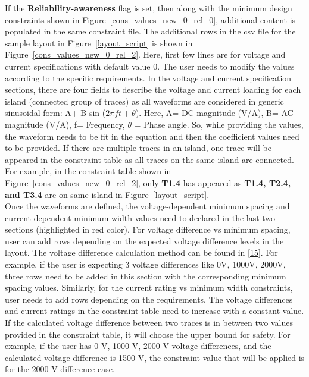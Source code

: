\documentclass[11pt]{article}
\begin{document}
\begin{enumerate}
If the \textbf{Reliability-awareness} flag is set, then along with the minimum design constraints shown in Figure~\ref{cons_values_new_0_rel_0}, additional content is populated in the same constraint file. The additional rows in the csv file for the sample layout in Figure~\ref{layout_script} is shown in Figure~\ref{cons_values_new_0_rel_2}. Here, first few lines are for voltage and current specifications with default value 0. The user needs to modify the values according to the specific requirements. In the voltage and current specification sections, there are four fields to describe the voltage and current loading for each island (connected group of traces) as all waveforms are considered in generic sinusoidal form: A+ B sin ($2\pi ft+\theta$). Here, A= DC magnitude (V/A), B= AC magnitude (V/A), f= Frequency, $\theta$ = Phase angle. So, while providing the values, the waveform needs to be fit in the equation and then the coefficient values need to be provided. If there are multiple traces in an island, one trace will be appeared in the constraint table as all traces on the same island are connected. For example, in the constraint table shown in Figure~\ref{cons_values_new_0_rel_2}, only \textbf{T1.4} has appeared as \textbf{T1.4, T2.4, and T3.4} are on same island in Figure~\ref{layout_script}.\\
Once the waveforms are defined, the voltage-dependent minimum spacing and current-dependent minimum width values need to declared in the last two sections (highlighted in red color). For voltage difference vs minimum spacing, user can add rows depending on the expected voltage difference levels in the layout. The voltage difference calculation method can be found in \href{./Publications/Y.Peng_NOLTA_20.pdf}{[15]}. For example, if the user is expecting 3 voltage differences like 0V, 1000V, 2000V, three rows need to be added in this section with the corresponding minimum spacing values. Similarly, for the current rating vs minimum width constraints, user needs to add rows depending on the requirements. The voltage differences and current ratings in the constraint table need to increase with a constant value. If the calculated voltage difference between two traces is in between two values provided in the constraint table, it will choose the upper bound for safety. For example,  if the user has 0 V, 1000 V, 2000 V voltage differences, and the calculated voltage difference is 1500 V, the constraint value that will be applied is for the 2000 V difference case.


\end{enumerate}
\end{document}
